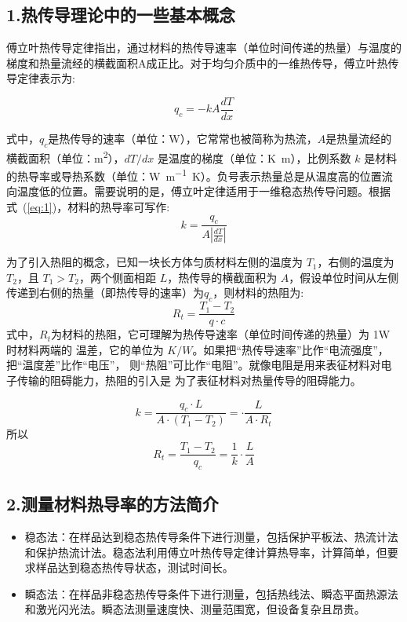 \documentclass[a4paper,utf8]{article}
\newcommand{\seqref}[1]{式~(\ref{#1})}
\begin{document}
    \subsection*{1.热传导理论中的一些基本概念}
    傅立叶热传导定律指出，通过材料的热传导速率（单位时间传递的热量）与温度的梯度和热量流经的横截面积A成正比。对于均匀介质中的一维热传导，傅立叶热传导定律表示为:\par
        \begin{equation}
            q_c=-kA\frac{dT}{dx} \label{eq:1}
        \end{equation} \par
        式中，$q_c$是热传导的速率（单位：\unit{\watt}），它常常也被简称为热流，$A$是热量流经的横截面积（单位：\unit{\meter\squared}），$dT/dx$ 是温度的梯度（单位：\unit{\kelvin\metre}），比例系数 $k$ 是材料的热导率或导热系数（单位：\unit{\watt\per\meter\kelvin}）。负号表示热量总是从温度高的位置流向温度低的位置。需要说明的是，傅立叶定律适用于一维稳态热传导问题。根据\seqref{eq:1}，材料的热导率可写作:
        \begin{equation}
            k=\frac{q_c}{A \displaystyle \left|\frac{dT}{dx}\right|} \label{eq:2}
        \end{equation} \par
        为了引入热阻的概念，已知一块长方体匀质材料左侧的温度为 $T_1$，右侧的温度为 $T_2$，且 $T_1 > T_2$，两个侧面相距 $L$，热传导的横截面积为 $A$，假设单位时间从左侧传递到右侧的热量（即热传导的速率）为$q_c$，则材料的热阻为:
        \begin{equation}
            R_t = \frac{T_1 - T_2}{q \cdot c} 
        \end{equation}
        式中，$R_t  $为材料的热阻，它可理解为热传导速率（单位时间传递的热量）为 1W 时材料两端的
温差，它的单位为 $K/W$。如果把“热传导速率”比作“电流强度”，把“温度差”比作“电压”，
则“热阻”可比作“电阻”。就像电阻是用来表征材料对电子传输的阻碍能力，热阻的引入是
为了表征材料对热量传导的阻碍能力。\par
        \begin{equation}
            k = \frac{q_c \cdot L}{A \cdot (T_1 - T_2)} =   \cdot \frac{L}{A \cdot R_t}
        \end{equation}
        所以
        \begin{equation}
            R_t=\frac{T_1-T_2}{q_c}=\frac{1}{k}\cdot\frac{L}{A} \label{eq:3}
        \end{equation} \par

    \subsection*{2.测量材料热导率的方法简介}
        \begin{itemize}
        \item 稳态法：在样品达到稳态热传导条件下进行测量，包括保护平板法、热流计法和保护热流计法。稳态法利用傅立叶热传导定律计算热导率，计算简单，但要求样品达到稳态热传导状态，测试时间长。
        \item 瞬态法：在样品非稳态热传导条件下进行测量，包括热线法、瞬态平面热源法和激光闪光法。瞬态法测量速度快、测量范围宽，但设备复杂且昂贵。
        \end{itemize}
\end{document}
